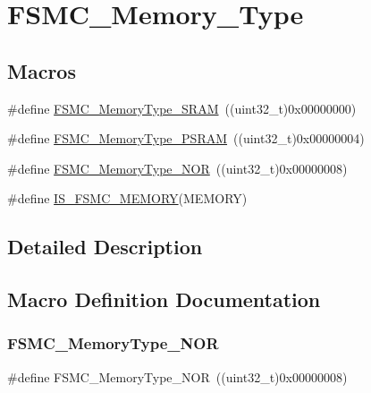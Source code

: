\hypertarget{group___f_s_m_c___memory___type}{}\section{F\+S\+M\+C\+\_\+\+Memory\+\_\+\+Type}
\label{group___f_s_m_c___memory___type}
\subsection*{Macros}
\begin{DoxyCompactItemize}
\item 
\#define \mbox{\hyperlink{group___f_s_m_c___memory___type_ga8a24e8da42e67dcf6fb2f43659aa49cf}{F\+S\+M\+C\+\_\+\+Memory\+Type\+\_\+\+S\+R\+AM}}~((uint32\+\_\+t)0x00000000)
\item 
\#define \mbox{\hyperlink{group___f_s_m_c___memory___type_gae3e680998b2fee8d56222634f5268a75}{F\+S\+M\+C\+\_\+\+Memory\+Type\+\_\+\+P\+S\+R\+AM}}~((uint32\+\_\+t)0x00000004)
\item 
\#define \mbox{\hyperlink{group___f_s_m_c___memory___type_ga8b9390abe7c281947c550bf4365649e5}{F\+S\+M\+C\+\_\+\+Memory\+Type\+\_\+\+N\+OR}}~((uint32\+\_\+t)0x00000008)
\item 
\#define \mbox{\hyperlink{group___f_s_m_c___memory___type_ga255cd500e141f4ac024cf5f896921233}{I\+S\+\_\+\+F\+S\+M\+C\+\_\+\+M\+E\+M\+O\+RY}}(M\+E\+M\+O\+RY)
\end{DoxyCompactItemize}


\subsection{Detailed Description}


\subsection{Macro Definition Documentation}
\mbox{\label{group___f_s_m_c___memory___type_ga8b9390abe7c281947c550bf4365649e5}} 
\subsubsection{\texorpdfstring{FSMC\_MemoryType\_NOR}{FSMC\_MemoryType\_NOR}}
{\footnotesize\ttfamily \#define F\+S\+M\+C\+\_\+\+Memory\+Type\+\_\+\+N\+OR~((uint32\+\_\+t)0x00000008)}

